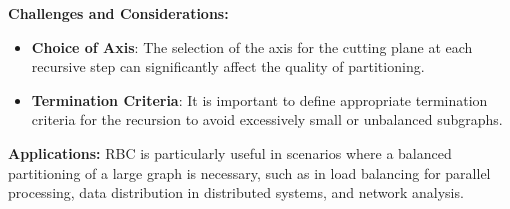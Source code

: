 \documentclass[unicode,11pt,a4paper,oneside,numbers=endperiod,openany]{scrartcl}
\begin{document}
\textbf{Challenges and Considerations:}
\begin{itemize}
    \item \textbf{Choice of Axis}: The selection of the axis for the cutting plane at each recursive step can significantly affect the quality of partitioning.
    \item \textbf{Termination Criteria}: It is important to define appropriate termination criteria for the recursion to avoid excessively small or unbalanced subgraphs.
\end{itemize}

\textbf{Applications:}
RBC is particularly useful in scenarios where a balanced partitioning of a large graph is necessary, such as in load balancing for parallel processing, data distribution in distributed systems, and network analysis.
\end{document}
